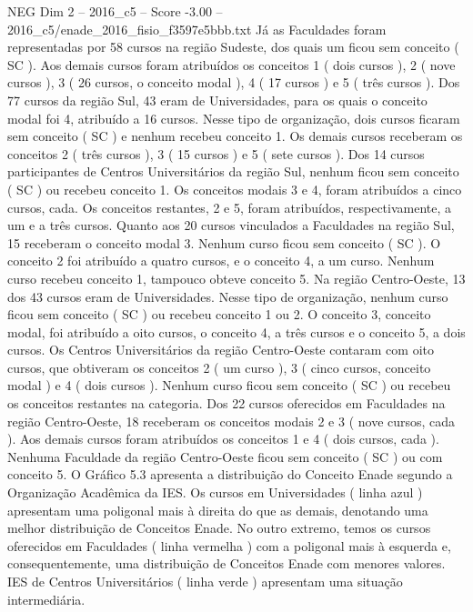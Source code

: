 \begin{textsample}{NEG Dim 2 – 2016\_c5 – Score -3.00 – 2016\_c5/enade\_2016\_fisio\_f3597e5bbb.txt}
Já as Faculdades foram representadas por 58 cursos na região Sudeste, dos quais um ficou sem conceito ( SC ).
Aos demais cursos foram atribuídos os conceitos 1 ( dois cursos ), 2 ( nove cursos ), 3 ( 26 cursos, o conceito modal ), 4 ( 17 cursos ) e 5 ( três cursos ).
Dos 77 cursos da região Sul, 43 eram de Universidades, para os quais o conceito modal foi 4, atribuído a 16 cursos.
Nesse tipo de organização, dois cursos ficaram sem conceito ( SC ) e nenhum recebeu conceito 1.
Os demais cursos receberam os conceitos 2 ( três cursos ), 3 ( 15 cursos ) e 5 ( sete cursos ).
Dos 14 cursos participantes de Centros Universitários da região Sul, nenhum ficou sem conceito ( SC ) ou recebeu conceito 1.
Os conceitos modais 3 e 4, foram atribuídos a cinco cursos, cada.
Os conceitos restantes, 2 e 5, foram atribuídos, respectivamente, a um e a três cursos.
Quanto aos 20 cursos vinculados a Faculdades na região Sul, 15 receberam o conceito modal 3.
Nenhum curso ficou sem conceito ( SC ).
O conceito 2 foi atribuído a quatro cursos, e o conceito 4, a um curso.
Nenhum curso recebeu conceito 1, tampouco obteve conceito 5.
Na região Centro-Oeste, 13 dos 43 cursos eram de Universidades.
Nesse tipo de organização, nenhum curso ficou sem conceito ( SC ) ou recebeu conceito 1 ou 2.
O conceito 3, conceito modal, foi atribuído a oito cursos, o conceito 4, a três cursos e o conceito 5, a dois cursos.
Os Centros Universitários da região Centro-Oeste contaram com oito cursos, que obtiveram os conceitos 2 ( um curso ), 3 ( cinco cursos, conceito modal ) e 4 ( dois cursos ).
Nenhum curso ficou sem conceito ( SC ) ou recebeu os conceitos restantes na categoria.
Dos 22 cursos oferecidos em Faculdades na região Centro-Oeste, 18 receberam os conceitos modais 2 e 3 ( nove cursos, cada ).
Aos demais cursos foram atribuídos os conceitos 1 e 4 ( dois cursos, cada ).
Nenhuma Faculdade da região Centro-Oeste ficou sem conceito ( SC ) ou com conceito 5.
O Gráfico 5.3 apresenta a distribuição do Conceito Enade segundo a Organização Acadêmica da IES.
Os cursos em Universidades ( linha azul ) apresentam uma poligonal mais à direita do que as demais, denotando uma melhor distribuição de Conceitos Enade.
No outro extremo, temos os cursos oferecidos em Faculdades ( linha vermelha ) com a poligonal mais à esquerda e, consequentemente, uma distribuição de Conceitos Enade com menores valores.
IES de Centros Universitários ( linha verde ) apresentam uma situação intermediária.

\end{textsample}
